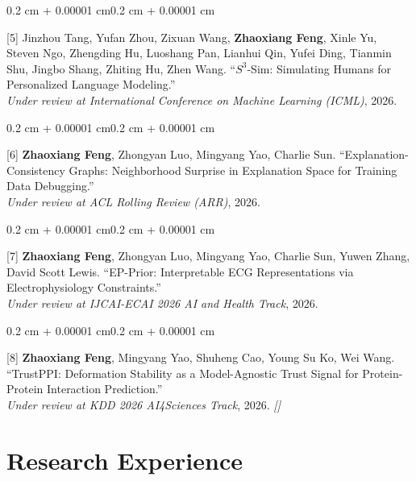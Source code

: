 \documentclass[10pt, letterpaper]{article}
\newenvironment{onecolentry}{
    \begin{adjustwidth}{0.2 cm + 0.00001 cm}{0.2 cm + 0.00001 cm}
}{\end{adjustwidth}}
\let\hrefWithoutArrow\href
\renewcommand{\href}[2]{\hrefWithoutArrow{#1}{\ifthenelse{\equal{#2}{}}{ }{#2}}}
\begin{document}
    \begin{onecolentry}
        [5] Jinzhou Tang, Yufan Zhou, Zixuan Wang, \textbf{Zhaoxiang Feng}, Xinle Yu, Steven Ngo, Zhengding Hu, Luoshang Pan, Lianhui Qin, Yufei Ding, Tianmin Shu, Jingbo Shang, Zhiting Hu, Zhen Wang. ``$S^3$-Sim: Simulating Humans for Personalized Language Modeling.''\\
        \textit{Under review at International Conference on Machine Learning (ICML)}, 2026.
    \end{onecolentry}

    \vspace{0.20 cm}

    \begin{onecolentry}
        [6] \textbf{Zhaoxiang Feng}, Zhongyan Luo, Mingyang Yao, Charlie Sun. ``Explanation-Consistency Graphs: Neighborhood Surprise in Explanation Space for Training Data Debugging.''\\
        \textit{Under review at ACL Rolling Review (ARR)}, 2026.
    \end{onecolentry}

    \vspace{0.20 cm}

    \begin{onecolentry}
        [7] \textbf{Zhaoxiang Feng}, Zhongyan Luo, Mingyang Yao, Charlie Sun, Yuwen Zhang, David Scott Lewis. ``EP-Prior: Interpretable ECG Representations via Electrophysiology Constraints.''\\
        \textit{Under review at IJCAI-ECAI 2026 AI and Health Track}, 2026.
    \end{onecolentry}

    \vspace{0.20 cm}

    \begin{onecolentry}
        [8] \textbf{Zhaoxiang Feng}, Mingyang Yao, Shuheng Cao, Young Su Ko, Wei Wang. ``TrustPPI: Deformation Stability as a Model-Agnostic Trust Signal for Protein-Protein Interaction Prediction.''\\
        \textit{Under review at KDD 2026 AI4Sciences Track}, 2026. \hfill \textit{[\href{https://github.com/aaronzhfeng/trust_ppi}{code}]}
    \end{onecolentry}

    \section{Research Experience}
\end{document}

